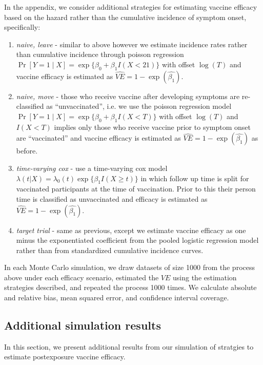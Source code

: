 \begin{appendix}
    In the appendix, we consider additional strategies for estimating vaccine efficacy based on the hazard rather than the cumulative incidence of symptom onset, specifically:
    \begin{enumerate}
        \item \textit{naive, leave} - similar to above however we estimate incidence rates rather than cumulative incidence through poisson regression $\Pr[Y = 1 \mid X] = \operatorname{exp}\{\beta_0 + \beta_1 I(X < 21)\}$ with offset $\log(T)$ and vaccine efficacy is estimated as $\widehat{VE} = 1 - \exp(\widehat{\beta_1})$.
        \item \textit{naive, move} - those who receive vaccine after developing symptoms are re-classified as ``unvaccinated'', i.e. we use the poisson regression model $\Pr[Y = 1 \mid X] = \operatorname{exp}\{\beta_0 + \beta_1 I(X < T)\}$ with offset $\log(T)$ and $I(X<T)$ implies only those who receive vaccine prior to symptom onset are ``vaccinated'' and vaccine efficacy is estimated as $\widehat{VE} = 1 - \exp(\widehat{\beta_1})$ as before.
        \item \textit{time-varying cox} - use a time-varying cox model $\lambda(t|X) = \lambda_0(t) \exp\{\beta_1 I(X \geq t)\}$ in which follow up time is split for vaccinated participants at the time of vaccination. Prior to this their person time is classified as unvaccinated and efficacy is estimated as $\widehat{VE} = 1 - \exp(\widehat{\beta_1})$.
        \item \textit{target trial} - same as previous, except  we estimate vaccine efficacy as one minus the exponentiated coefficient from the pooled logistic regression model rather than from standardized cumulative incidence curves.
    \end{enumerate}

    In each Monte Carlo simulation, we draw datasets of size 1000 from the process above under each efficacy scenario, estimated the $VE$ using the estimation strategies described, and repeated the process 1000 times. We calculate absolute and relative bias, mean squared error, and confidence interval coverage.

    \subsection{Additional simulation results}

    In this section, we present additional results from our simulation of stratgies to estimate postexposure vaccine efficacy. 


\end{appendix}
